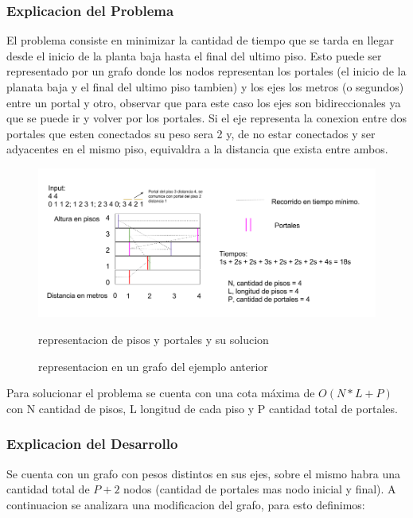 \pagebreak
\subsubsection{Explicacion del Problema}
    El problema consiste en minimizar la cantidad de tiempo que se tarda en llegar desde el inicio de la planta baja hasta el final del ultimo piso. Esto puede ser representado por un grafo donde los nodos representan los portales (el inicio de la planata baja y el final del ultimo piso tambien) y los ejes los metros (o segundos) entre un portal y otro, observar que para este caso los ejes son bidireccionales ya que se puede ir y volver por los portales. Si el eje representa la conexion entre dos portales que esten conectados su peso sera 2 y, de no estar conectados y ser adyacentes en el mismo piso, equivaldra a la distancia que exista entre ambos.
    
    \begin{figure}
    \centering
    
    \includegraphics[scale=0.5]{imagenes/dibujito2.png}
    \caption{representacion de pisos y portales y su solucion}
    \label{fig:my_label}
    
    
    \caption{representacion en un grafo del ejemplo anterior}
    \end{figure}
    
    Para solucionar el problema se cuenta con una cota m\'axima de $O(N*L + P)$ con N cantidad de pisos, L longitud de cada piso y P cantidad total de portales.
    
\subsubsection{Explicacion del Desarrollo}
    Se cuenta con un grafo con pesos distintos en sus ejes, sobre el mismo habra una cantidad total de $P + 2$ nodos (cantidad de portales mas nodo inicial y final). 
    A continuacion se analizara una modificacion del grafo, para esto definimos: \\

